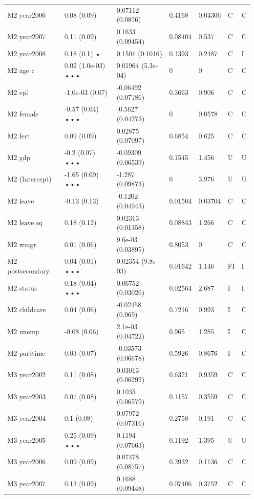 {\begin{longtable}{@{}p{.245\linewidth}p{.17\linewidth}p{.17\linewidth}p{.085\linewidth}p{.060\linewidth}p{.08\linewidth}p{.07\linewidth}@{}}
M2 year2006 & 0.08 (0.09) & 0.07112 (0.0876) & 0.4168 & 0.04306 & C & C\\
M2 year2007 & 0.11 (0.09) & 0.1633 (0.09454) & 0.08404 & 0.537 & C & C\\
M2 year2008 & 0.18 (0.1) • & 0.1501 (0.1016) & 0.1393 & 0.2487 & C & I\\
M2 age c & 0.02 (1.0e-03) ••• & 0.01964 (5.3e-04) & 0 & 0 & C & C\\
M2 epl & -1.0e-03 (0.07) & -0.06492 (0.07186) & 0.3663 & 0.906 & C & C\\
M2 female & -0.57 (0.04) ••• & -0.5627 (0.04273) & 0 & 0.0578 & C & C\\
M2 fert & 0.09 (0.09) & 0.02875 (0.07097) & 0.6854 & 0.625 & C & C\\
M2 gdp & -0.2 (0.07) ••• & -0.09309 (0.06539) & 0.1545 & 1.456 & U & U\\
M2 (Intercept) & -1.65 (0.09) ••• & -1.287 (0.09873) & 0 & 3.976 & U & U\\
M2 leave & -0.13 (0.13) & -0.1202 (0.04943) & 0.01504 & 0.03704 & C & C\\
M2 leave sq & 0.18 (0.12) & 0.02313 (0.01358) & 0.08843 & 1.266 & C & C\\
M2 wmgr & 0.01 (0.06) & 9.6e-03 (0.03895) & 0.8053 & 0 & C & C\\
M2 postsecondary & 0.04 (0.01) ••• & 0.02354 (9.8e-03) & 0.01642 & 1.146 & FI & I\\
M2 status & 0.18 (0.04) ••• & 0.06752 (0.03026) & 0.02564 & 2.687 & I & I\\
M2 childcare & 0.04 (0.06) & -0.02458 (0.069) & 0.7216 & 0.993 & I & C\\
M2 unemp & -0.08 (0.06) & 2.1e-03 (0.04722) & 0.965 & 1.285 & I & C\\
M2 parttime & 0.03 (0.07) & -0.03573 (0.06678) & 0.5926 & 0.8676 & I & C\\
M3 year2002 & 0.11 (0.08) & 0.03013 (0.06292) & 0.6321 & 0.9359 & C & C\\
M3 year2003 & 0.07 (0.08) & 0.1035 (0.06579) & 0.1157 & 0.3559 & C & C\\
M3 year2004 & 0.1 (0.08) & 0.07972 (0.07316) & 0.2758 & 0.191 & C & C\\
M3 year2005 & 0.25 (0.09) ••• & 0.1194 (0.07663) & 0.1192 & 1.395 & U & U\\
M3 year2006 & 0.09 (0.09) & 0.07478 (0.08757) & 0.3932 & 0.1136 & C & C\\
M3 year2007 & 0.13 (0.09) & 0.1688 (0.09448) & 0.07406 & 0.3752 & C & C\\

\end{longtable}}
